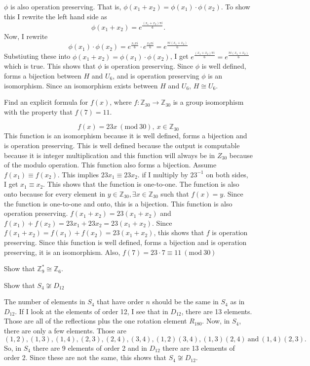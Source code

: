 \documentclass[titlepage]{article}
\newenvironment{problem}[2][Problem]{\begin{tcolorbox}\begin{trivlist}
\item[\hskip \labelsep {\bfseries #1}\hskip \labelsep {\bfseries #2.}]}{\end{trivlist}\end{tcolorbox}}
\begin{document}
$\phi$ is also operation preserving. That is, $\phi(x_1 + x_2) = \phi(x_1) \cdot \phi(x_2)$. To show this I rewrite the left hand side as
$$ \phi(x_1 + x_2) = e^{\frac{(x_1 + x_2)\pi i}{6}}.$$
Now, I rewrite
$$\phi(x_1) \cdot \phi(x_2) = e^{\frac{x_1 \pi i}{6}} \cdot e^{\frac{x_2 \pi i}{6}} = e^{\frac{\pi i (x_1 + x_2)}{6}}$$
Substiuting these into $\phi(x_1 + x_2) = \phi(x_1) \cdot \phi(x_2)$, I get $e^{\frac{(x_1 + x_2)\pi i}{6}} = e^{\frac{\pi i (x_1 + x_2)}{6}}$ which is true. This shows that $\phi$ is operation preserving. Since $\phi$ is well defined, forms a bijection between $H$ and $U_6$, and is operation preserving $\phi$ is an isomorphism. Since an isomorphism exists between $H$ and $U_6$, $H \cong U_6$.


\begin{problem}{4}
Find an explicit formula for $f(x)$, where $f:\mathbb{Z}_{30} \rightarrow \mathbb{Z}_{30}$ is a group isomorphism with the property that $f(7) = 11$. 
\end{problem}
$$f(x) = 23x \ (\text{mod} \ 30), \ x \in \mathbb{Z}_{30}$$
This function is an isomorphism because it is well defined, forms a bijection and is operation preserving. This is well defined because the output is computable because it is integer multiplication and this function will always be in $Z_{30}$ because of the modulo operation. This function also forms a bijection. Assume $f(x_1) \equiv f(x_2)$. This implies $23x_1 \equiv 23x_2.$ if I multiply by $23^{-1}$ on both sides, I get $x_1 \equiv x_2$. This shows that the function is one-to-one. The function is also onto because for every element in $y \in \mathbb{Z}_{30}, \exists x \in \mathbb{Z}_{30}$ such that $f(x) = y$. Since the function is one-to-one and onto, this is a bijection. This function is also operation preserving. $f(x_1 + x_2) = 23(x_1 + x_2)$ and $f(x_1) + f(x_2) = 23x_1 + 23x_2 = 23(x_1  + x_2)$. Since $f(x_1 + x_2) = f(x_1) + f(x_2) = 23(x_1 + x_2)$, this shows that $f$ is operation preserving. Since this function is well defined, forms a bijection and is operation preserving, it is an isomorphism. Also, $f(7) = 23\cdot7 \equiv 11 \ (\text{mod} \ 30)$


\begin{problem}{5}
Show that $\mathbb{Z}^*_{9} \cong \mathbb{Z}_6$.	
\end{problem}

\begin{problem}{6}
Show that $S_4 \not \cong D_{12}$ 
\end{problem}
The number of elements in $S_4$ that have order $n$ should be the same in $S_4$ as in $D_{12}$. If I look at the elements of order 12, I see that in $D_{12}$, there are 13 elements. Those are all of the reflections plus the one rotation element $R_{180}$. Now, in $S_4$, there are only a few elements. Those are $$(1,2),(1,3),(1,4),(2,3),(2,4),(3,4),(1,2)(3,4),(1,3)(2,4) \ \text{and} \
 (1,4)(2,3).$$ So, in $S_4$ there are 9 elements of order 2 and in $D_{12}$ there are 13 elements of order 2. Since these are not the same, this shows that $S_4 \not \cong D_{12}$.
\end{document}
